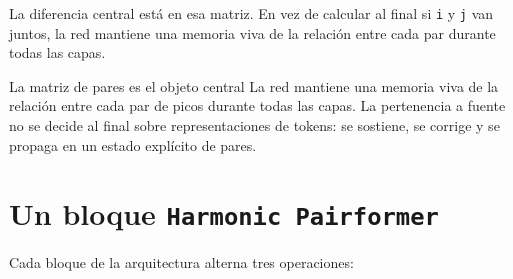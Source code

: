 \documentclass[11pt]{article}
\begin{document}
\begin{figure}[H]
\end{figure}

La diferencia central está en esa matriz. En vez de calcular al final si \texttt{i} y \texttt{j} van juntos, la red mantiene una memoria viva de la relación entre cada par durante todas las capas.

\begin{keybox}{La matriz de pares es el objeto central}
La red mantiene una memoria viva de la relación entre cada par de picos durante todas las capas. La pertenencia a fuente no se decide al final sobre representaciones de tokens: se sostiene, se corrige y se propaga en un estado explícito de pares.
\end{keybox}

\section{Un bloque \texttt{Harmonic Pairformer}}

Cada bloque de la arquitectura alterna tres operaciones:
\end{document}
